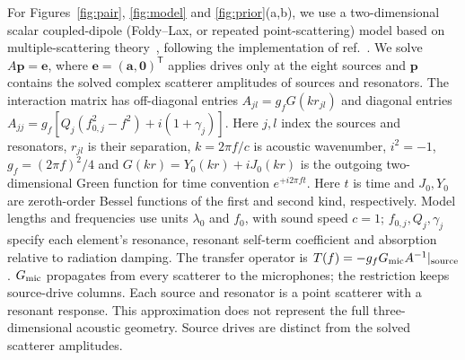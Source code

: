 \documentclass[lineno,pdflatex,sn-nature]{sn-jnl}%
\theoremstyle{thmstyleone}%
\theoremstyle{thmstyletwo}%
\theoremstyle{thmstylethree}%
\begin{document}
For Figures~\ref{fig:pair}, \ref{fig:model} and \ref{fig:prior}(a,b), we use a two-dimensional scalar coupled-dipole (Foldy--Lax, or repeated point-scattering) model based on multiple-scattering theory~\cite{foldy1945,lax1951}, following the implementation of ref.~\cite{orazbayev2020}. We solve $A\bm p=\bm e$, where $\bm e=(\mathbf a,\mathbf0)^{\mathsf T}$ applies drives only at the eight sources and $\bm p$ contains the solved complex scatterer amplitudes of sources and resonators. The interaction matrix has off-diagonal entries $A_{jl}=g_fG(kr_{jl})$ and diagonal entries $A_{jj}=g_f[Q_j(f_{0,j}^2-f^2)+i(1+\gamma_j)]$. Here $j,l$ index the sources and resonators, $r_{jl}$ is their separation, $k=2\pi f/c$ is acoustic wavenumber, $i^2=-1$, $g_f=(2\pi f)^2/4$ and $G(kr)=Y_0(kr)+iJ_0(kr)$ is the outgoing two-dimensional Green function for time convention $e^{+i2\pi ft}$. Here $t$ is time and $J_0,Y_0$ are zeroth-order Bessel functions of the first and second kind, respectively. Model lengths and frequencies use units $\lambda_0$ and $f_0$, with sound speed $c=1$; $f_{0,j},Q_j,\gamma_j$ specify each element's resonance, resonant self-term coefficient and absorption relative to radiation damping. The transfer operator is $T(f)=-g_fG_{\rm mic}A^{-1}|_{\rm source}$. $G_{\rm mic}$ propagates from every scatterer to the microphones; the restriction keeps source-drive columns. Each source and resonator is a point scatterer with a resonant response. This approximation does not represent the full three-dimensional acoustic geometry. Source drives are distinct from the solved scatterer amplitudes.
\end{document}
